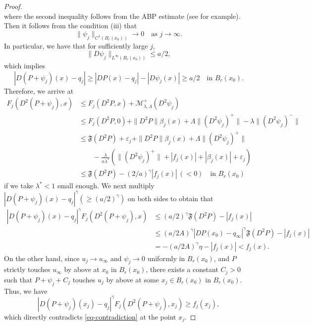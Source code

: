 \documentclass[11pt]{amsart}
\theoremstyle{plain}
\theoremstyle{definition}
\numberwithin{equation}{section}
\begin{document}
\begin{proof}
\begin{equation*}
    \end{equation*}
    where the second inequality follows from the ABP estimate (see \cite[Theorem~3.2]{CC95} for example). Then it follows from the condition (iii) that
    \begin{equation*}
        \|\psi_j\|_{C^1(B_r(x_0))} \to 0 \quad \text{as $j \to \infty$}.
    \end{equation*}
    In particular, we have that for sufficiently large $j$, 
    \begin{equation*}
        \|D\psi_j\|_{L^{\infty}(B_{r}(x_0))} \leq a/2,
    \end{equation*}
    which implies
    \begin{equation*}
        |D(P+\psi_j)(x)-q_j| \geq |DP(x)-q_j|-|D\psi_j(x)| \geq a/2 \quad \text{in $B_{r}(x_0)$}.
    \end{equation*}
    Therefore, we arrive at
    \begin{equation*}
    \begin{aligned}
        F_j(D^2(P+\psi_j), x) &\leq F_j(D^2P, x)+\mathcal{M}^+_{\lambda, \Lambda}(D^2\psi_j) \\
        &\leq F_j(D^2P, 0)+\|D^2P\| \beta_j(x)+\Lambda\|(D^2\psi_j)^+\|-\lambda \|(D^2\psi_j)^-\|\\
        &\leq \mathfrak{F}(D^2P)+\varepsilon_j+\|D^2P\| \beta_j(x)+\Lambda\|(D^2\psi_j)^+\| \\
        &\qquad -\frac{\lambda}{n\lambda^{\ast}} \left(\|(D^2\psi_j)^+\|+|f_j(x)|+|\beta_j(x)|+\varepsilon_j \right)\\
        &\leq \mathfrak{F}(D^2P)-(2/a)^{\gamma}|f_j(x)| \, (<0) \quad \text{in $B_r(x_0)$}
    \end{aligned}
    \end{equation*}
    if we take $\lambda^{\ast}<1$ small enough. We next multiply $|D(P+\psi_j)(x)-q_j|^{\gamma} (\geq (a/2)^{\gamma})$ on both sides to obtain that
    \begin{equation}\label{eq-contradiction}
        \begin{aligned}
            |D(P+\psi_j)(x)-q_j|^{\gamma}F_j(D^2(P+\psi_j), x) &\leq (a/2)^{\gamma}\mathfrak{F}(D^2P)-|f_j(x)|\\
            &\leq (a/2A)^{\gamma} |DP(x_0)-q_{\infty}|^{\gamma}\mathfrak{F}(D^2P)-|f_j(x)|\\
            &=-(a/2A)^{\gamma}\eta-|f_j(x)|<f_j(x).
        \end{aligned}
    \end{equation}
    On the other hand, since $u_j \to u_{\infty}$ and $\psi_j \to 0$ uniformly in $B_r(x_0)$, and $P$ strictly touches $u_{\infty}$ by above at $x_0$ in $B_r(x_0)$, there exists a constant $C_j>0$ such that $P+\psi_j+C_j$ touches $u_j$ by above at some $x_j \in B_r(x_0)$ in $B_r(x_0)$. Thus, we have
    \begin{equation*}
        |D(P+\psi_j)(x_j)-q_j|^{\gamma}F_j(D^2(P+\psi_j), x_j) \geq f_j(x_j),
    \end{equation*}
    which directly contradicts \eqref{eq-contradiction} at the point  $x_j$.\newline


\end{proof}
\end{document}
